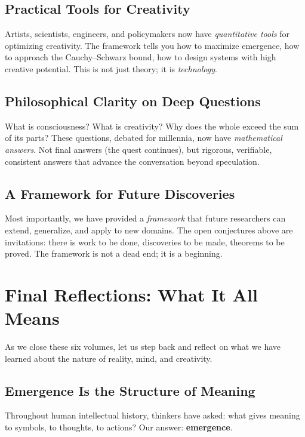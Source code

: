 \subsection{Practical Tools for Creativity}

Artists, scientists, engineers, and policymakers now have \emph{quantitative
tools} for optimizing creativity. The framework tells you how to maximize
emergence, how to approach the Cauchy--Schwarz bound, how to design systems
with high creative potential. This is not just theory; it is \emph{technology}.

\subsection{Philosophical Clarity on Deep Questions}

What is consciousness? What is creativity? Why does the whole exceed the sum
of its parts? These questions, debated for millennia, now have \emph{mathematical
answers}. Not final answers (the quest continues), but rigorous, verifiable,
consistent answers that advance the conversation beyond speculation.

\subsection{A Framework for Future Discoveries}

Most importantly, we have provided a \emph{framework} that future researchers
can extend, generalize, and apply to new domains. The open conjectures above
are invitations: there is work to be done, discoveries to be made, theorems
to be proved. The framework is not a dead end; it is a beginning.


\section{Final Reflections: What It All Means}

As we close these six volumes, let us step back and reflect on what we have
learned about the nature of reality, mind, and creativity.

\subsection{Emergence Is the Structure of Meaning}

Throughout human intellectual history, thinkers have asked: what gives meaning
to symbols, to thoughts, to actions? Our answer: \textbf{emergence}.


